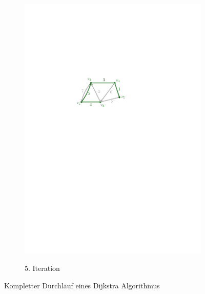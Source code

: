 \documentclass[12pt,a4paper]{article}
\begin{document}
\begin{figure}[h]
\begin{subfigure}{0.32\textwidth}
\includegraphics[width = \textwidth]{../media/dijkstra5.pdf} \\
\caption{5. Iteration}
\vspace{0.5cm}
\label{fig:dijkstra5}
\end{subfigure}
\caption{Kompletter Durchlauf eines Dijkstra Algorithmus}
\label{dijkstraIterations}
\end{figure}
\end{document}
